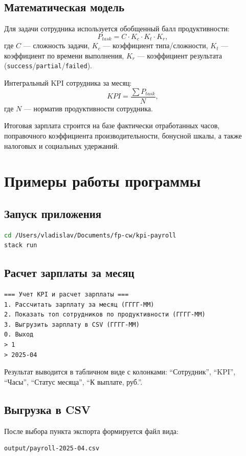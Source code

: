 \documentclass[a4paper,14pt]{extarticle}
\begin{document}
\subsection{Математическая модель}
Для задачи сотрудника используется обобщенный балл продуктивности:
\[
P_{task} = C \cdot K_c \cdot K_t \cdot K_r,
\]
где \(C\) --- сложность задачи, \(K_c\) --- коэффициент типа/сложности, \(K_t\) --- коэффициент по времени выполнения, \(K_r\) --- коэффициент результата (\texttt{success}/\texttt{partial}/\texttt{failed}).

Интегральный KPI сотрудника за месяц:
\[
KPI = \frac{\sum P_{task}}{N},
\]
где \(N\) --- норматив продуктивности сотрудника.

Итоговая зарплата строится на базе фактически отработанных часов, поправочного коэффициента производительности, бонусной шкалы, а также налоговых и социальных удержаний.

\section{Примеры работы программы}

\subsection{Запуск приложения}
\begin{lstlisting}[language=bash,caption={Запуск проекта}]
cd /Users/vladislav/Documents/fp-cw/kpi-payroll
stack run
\end{lstlisting}

\subsection{Расчет зарплаты за месяц}
\begin{lstlisting}[caption={Фрагмент диалога в консоли}]
=== Учет KPI и расчет зарплаты ===
1. Рассчитать зарплату за месяц (ГГГГ-ММ)
2. Показать топ сотрудников по продуктивности (ГГГГ-ММ)
3. Выгрузить зарплату в CSV (ГГГГ-ММ)
0. Выход
> 1
> 2025-04
\end{lstlisting}

Результат выводится в табличном виде с колонками: ``Сотрудник'', ``KPI'', ``Часы'', ``Статус месяца'', ``К выплате, руб.''.

\subsection{Выгрузка в CSV}
После выбора пункта экспорта формируется файл вида:
\begin{lstlisting}[language=bash,caption={Пример выходного файла}]
output/payroll-2025-04.csv
\end{lstlisting}
\end{document}
